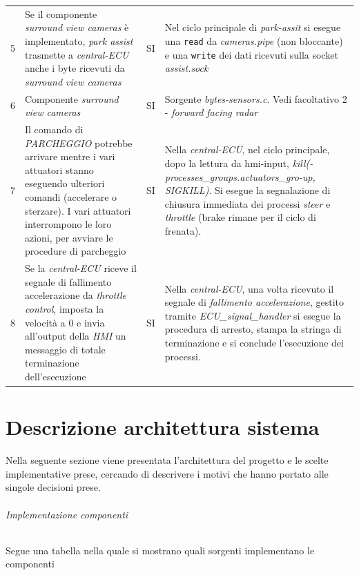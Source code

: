 \documentclass[11pt, openany]{article}
\theoremstyle{definition}
\theoremstyle{plain}
\theoremstyle{remark}
\begin{document}
\begin{tcolorbox}[width=\textwidth,move upwards= -16pt , colback={Cornsilk2}]
\begin{tabularx}{\textwidth}{lXcX}
			5	&	Se il componente \textit{surround view cameras} è implementato, \textit{park assist} trasmette a \textit{central-ECU} anche i byte ricevuti da \textit{surround view cameras}	&	SI	&
			Nel ciclo principale di \textit{park-assit} si esegue una \texttt{read} da \textit{cameras.pipe} (non bloccante) e una \texttt{write} dei dati ricevuti sulla socket \textit{assist.sock} \\\vspace{0.1cm}
			6	&	Componente \textit{surround view cameras}	&	SI	&
			Sorgente \textit{bytes-sensors.c}. Vedi facoltativo 2 - \textit{forward facing radar}	\\\vspace{0.1cm}
			7	&	Il comando di \textit{PARCHEGGIO} potrebbe arrivare mentre i vari attuatori stanno eseguendo ulteriori comandi (accelerare o sterzare). I vari attuatori interrompono le loro azioni, per avviare le procedure di parcheggio	&	SI	&
			Nella \textit{central-ECU}, nel ciclo principale, dopo la lettura da hmi-input, \textit{kill(-processes\_groups.actuators\_gro-up, SIGKILL)}. Si esegue la segnalazione di chiusura immediata dei processi  \textit{steer} e \textit{throttle} (brake rimane per il ciclo di frenata).\\
			8	&	Se la \textit{central-ECU }riceve il segnale di fallimento accelerazione da \textit{throttle control}, imposta la velocità a 0 e invia all'output della \textit{HMI} un messaggio di totale terminazione dell'esecuzione	&	SI	&
			Nella \textit{central-ECU}, una volta ricevuto il segnale di \textit{fallimento accelerazione}, gestito tramite \textit{ECU\_signal\_handler} si esegue la procedura di arresto, stampa la stringa di terminazione e si conclude l'esecuzione dei processi.
			
		\end{tabularx}
		\label{tab:facoltativi}
	\end{tcolorbox}
	\part{Descrizione architettura sistema}
	Nella seguente sezione viene presentata l'architettura del progetto e le scelte implementative prese, cercando di descrivere i motivi che hanno portato alle singole decisioni prese.
	
	\paragraph{Implementazione componenti}
	\footnotesize Segue una tabella nella quale si mostrano quali sorgenti implementano le componenti
	\normalsize
	
\end{document}
